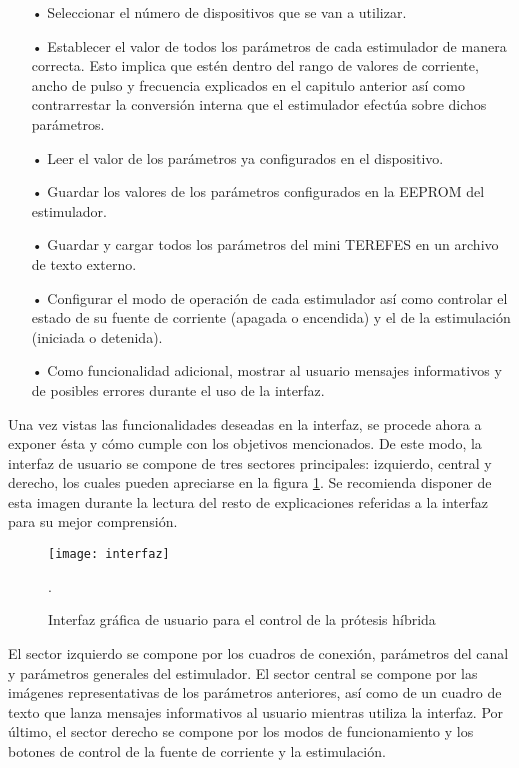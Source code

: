 \begin{itemize}
\item[•] Seleccionar el número de dispositivos que se van a utilizar.
\item[•] Establecer el valor de todos los parámetros de cada estimulador de manera correcta. Esto implica que estén dentro del rango de valores de corriente, ancho de pulso y frecuencia explicados en el capitulo anterior así como contrarrestar la conversión interna que el estimulador efectúa sobre dichos parámetros.
\item[•] Leer el valor de los parámetros ya configurados en el dispositivo.
\item[•] Guardar los valores de los parámetros configurados en la EEPROM del estimulador.
\item[•] Guardar y cargar todos los parámetros del mini TEREFES en un archivo de texto externo.
\item[•] Configurar el modo de operación de cada estimulador así como controlar el estado de su fuente de corriente (apagada o encendida) y el de la estimulación (iniciada o detenida).
\item[•] Como funcionalidad adicional, mostrar al usuario mensajes informativos y de posibles errores durante el uso de la interfaz.
\end{itemize} 

Una vez vistas las funcionalidades deseadas en la interfaz, se procede ahora a exponer ésta y cómo cumple con los objetivos mencionados. De este modo, la interfaz de usuario se compone de tres sectores principales: izquierdo, central y derecho, los cuales pueden apreciarse en la figura \ref{fig:interfaz}. Se recomienda disponer de esta imagen durante la lectura del resto de explicaciones referidas a la interfaz para su mejor comprensión.\\

\begin{figure}[!htb]
\centering
\texttt{[image: interfaz]}
  \caption{Interfaz gráfica de usuario para el control de la prótesis híbrida}.\label{fig:interfaz}
\end{figure}

El sector izquierdo se compone por los cuadros de conexión, parámetros del canal y parámetros generales del estimulador. El sector central se compone por las imágenes representativas de los parámetros anteriores, así como de un cuadro de texto que lanza mensajes informativos al usuario mientras utiliza la interfaz. Por último, el sector derecho se compone por los modos de funcionamiento y los botones de control de la fuente de corriente y la estimulación.


